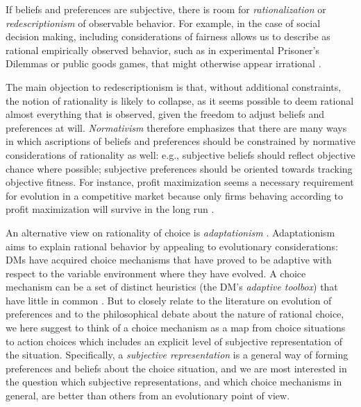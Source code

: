 \documentclass[fleqn,reqno,12pt]{article}
\theoremstyle{Satz}
\theoremstyle{Bsp}
\begin{document}
If beliefs and preferences are subjective, there is room for \emph{rationalization} or
\emph{redescriptionism} of observable behavior. For example,
in the case of social decision making, including considerations of fairness allows us to
describe as rational empirically observed behavior, such as in experimental Prisoner's Dilemmas
or public goods games, that might otherwise appear irrational
\citep[e.g.,][]{fehrschmidt99,charrab02}.

The main objection to redescriptionism is that, without additional constraints, the notion of
rationality is likely to collapse, as it seems possible to deem rational almost everything that
is observed, given the freedom to adjust beliefs and preferences at will. \emph{Normativism}
therefore emphasizes that there are many ways in which ascriptions of beliefs and preferences
should be constrained by normative considerations of rationality as well: e.g., subjective
beliefs should reflect objective chance where possible; subjective preferences should be
oriented towards tracking objective fitness. For instance, profit maximization seems a
necessary requirement for evolution in a competitive market because only firms behaving
according to profit maximization will survive in the long run \citep[e.g.,][]{alch50,Fried53}.

An alternative view on rationality of choice is \emph{adaptationism}
\citep[e.g.,][]{Anderson1991:Is-human-cognit,ChaterOaksford2000:The-Rational-An,HagenChater2012:Decision-Making}. Adaptationism
aims to explain rational behavior by appealing to evolutionary considerations: DMs have acquired
choice mechanisms that have proved to be adaptive with respect to the variable environment
where they have evolved. A choice mechanism can be a set of distinct heuristics (the DM's
\emph{adaptive toolbox}) that have little in common
\citep[e.g.,][]{TverskyKahnemann1981:The-Framing-of-,GigerenzerGoldstein1996:Reasoning-the-F,ScheibehenneRieskamp2013:Testing-the-Ada}. But
to closely relate to the literature on evolution of preferences and to the philosophical debate
about the nature of rational choice, we here suggest to think of a choice mechanism
as a map from choice situations to action choices which includes an explicit level of subjective representation of the situation. Specifically, a \emph{subjective representation} is a general way of forming preferences and beliefs about the choice situation, and we
are most interested in the question which subjective representations, and which choice mechanisms in general, are better than others
from an evolutionary point of view.
\end{document}
